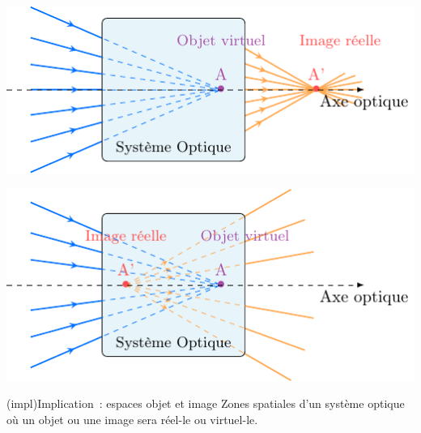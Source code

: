 \documentclass[../../main/main.tex]{subfiles}
\begin{document}
\begin{tcb}[label=exem:rellvirt]
\begin{minipage}{0.45\linewidth}
\begin{center}
			\includegraphics[width=\linewidth]{obj_v-img_r}
			\label{fig:objvimgr}
		\end{center}
	\end{minipage}
	\hfill
	\begin{minipage}{0.45\linewidth}
		\begin{center}
			\includegraphics[width=\linewidth]{obj_v-img_v}
			\label{fig:objvimgv}
		\end{center}
	\end{minipage}
\end{tcb}

\begin{tcb}[label=impl:objimg_espace](impl){Implication~: espaces objet et image}
	Zones spatiales d'un système optique où un objet ou une image sera réel-le ou
	virtuel-le.
	\begin{center}
	\end{center}
\end{tcb}
\end{document}
